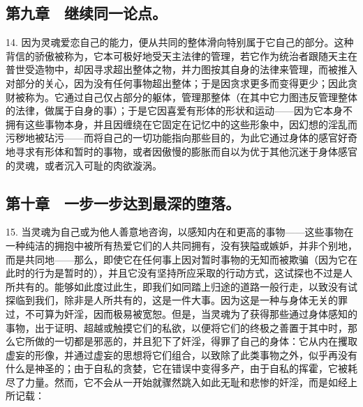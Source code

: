 
\subsection{第九章　继续同一论点。}

14. 因为灵魂爱恋自己的能力，便从共同的整体滑向特别属于它自己的部分。这种背信的骄傲被称为，它本可极好地受天主法律的管理，若它作为统治者跟随天主在普世受造物中，却因寻求超出整体之物，并力图按其自身的法律来管理，而被推入对部分的关心，因为没有任何事物超出整体；于是因贪求更多而变得更少；因此贪财被称为。它通过自己仅占部分的躯体，管理那整体（在其中它力图违反管理整体的法律，做属于自身的事）；于是它因喜爱有形体的形状和运动——因为它本身不拥有这些事物本身，并且因缠绕在它固定在记忆中的这些形象中，因幻想的淫乱而污秽地被玷污——而将自己的一切功能指向那些目的，为此它通过身体的感官好奇地寻求有形体和暂时的事物，或者因傲慢的膨胀而自以为优于其他沉迷于身体感官的灵魂，或者沉入可耻的肉欲漩涡。\par


\subsection{第十章　一步一步达到最深的堕落。}

15. 当灵魂为自己或为他人善意地咨询，以感知内在和更高的事物——这些事物在一种纯洁的拥抱中被所有热爱它们的人共同拥有，没有狭隘或嫉妒，并非个别地，而是共同地——那么，即使它在任何事上因对暂时事物的无知而被欺骗（因为它在此时的行为是暂时的），并且它没有坚持所应采取的行动方式，这试探也不过是人所共有的。能够如此度过此生，即我们如同踏上归途的道路一般行走，以致没有试探临到我们，除非是人所共有的，这是一件大事。因为这是一种与身体无关的罪过，不可算为奸淫，因而极易被宽恕。但是，当灵魂为了获得那些通过身体感知的事物，出于证明、超越或触摸它们的私欲，以便将它们的终极之善置于其中时，那么它所做的一切都是邪恶的，并且犯下了奸淫，得罪了自己的身体：它从内在攫取虚妄的形像，并通过虚妄的思想将它们组合，以致除了此类事物之外，似乎再没有什么是神圣的；由于自私的贪婪，它在错误中变得多产，由于自私的挥霍，它被耗尽了力量。然而，它不会从一开始就骤然跳入如此无耻和悲惨的奸淫，而是如经上所记载：\par


